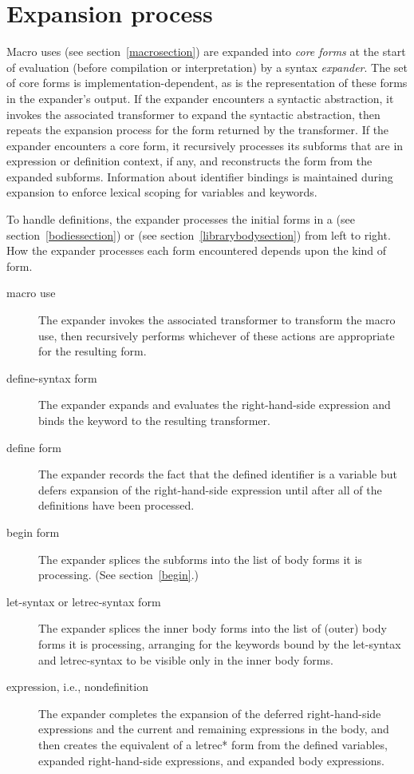 \chapter{Expansion process}
\label{expansionchapter}

Macro uses (see section~\ref{macrosection}) are expanded into \textit{core
forms} at the start of evaluation (before compilation or interpretation)
by a syntax \emph{expander}.
The set of core forms is implementation-dependent, as is the
representation of these forms in the expander's output.
If the expander encounters a syntactic abstraction, it invokes
the associated transformer to expand the syntactic abstraction, then
repeats the expansion process for the form returned by the transformer.
If the expander encounters a core form, it recursively
processes its subforms that are in expression or definition context,
if any, and reconstructs the form from the
expanded subforms.
Information about identifier bindings is maintained during expansion
to enforce lexical scoping for variables and keywords.

To handle definitions, the expander processes the initial
forms in a  (see section~\ref{bodiessection}) or
 (see section~\ref{librarybodysection})
from left to
right.  How the expander processes each form encountered 
depends upon the kind of form.

\begin{description}
\item[macro use]
The expander invokes the associated transformer to transform the macro
use, then recursively performs whichever of these actions are appropriate
for the resulting form.

\item[{\cf define-syntax} form]
The expander expands and evaluates the right-hand-side expression and binds the
keyword to the resulting transformer.

\item[{\cf define} form]
The expander records the fact that the defined identifier is a variable but defers
expansion of the right-hand-side expression until after all of the
definitions have been processed.

\item[{\cf begin} form]
The expander splices the subforms into the list of body forms it is
processing.  (See section~\ref{begin}.)

\item[{\cf let-syntax} or {\cf letrec-syntax} form]
The expander splic\-es the inner body forms into the list of (outer) body forms it is
processing, arranging for the keywords bound by the {\cf let-syntax}
and {\cf letrec-syntax} to be visible only in the inner body forms.

\item[expression, i.e., nondefinition]
The expander completes the expansion of the deferred right-hand-side expressions
and the current and remaining expressions in the body, and then
creates the equivalent of a {\cf letrec*} form from the defined variables,
expanded right-hand-side expressions, and expanded body expressions.
\end{description}

